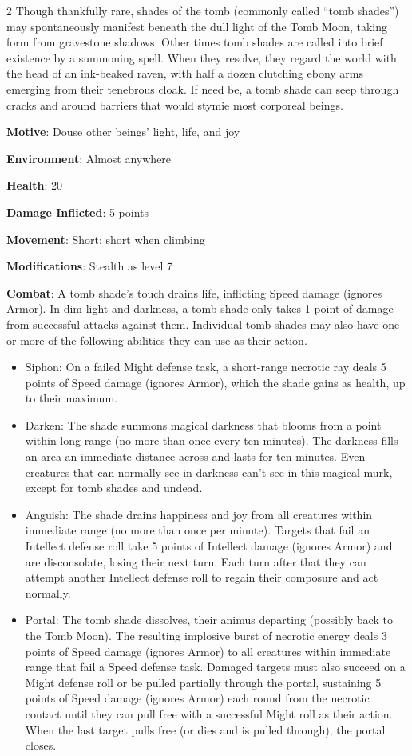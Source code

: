 \begin{multicols}{2}
Though thankfully rare, shades of the tomb (commonly called “tomb shades”) may spontaneously manifest beneath the dull light of the Tomb Moon, taking form from gravestone shadows. Other times tomb shades are called into brief existence by a summoning spell. When they resolve, they regard the world with the head of an ink-beaked raven, with half a dozen clutching ebony arms emerging from their tenebrous cloak. If need be, a tomb shade can seep through cracks and around barriers that would stymie most corporeal beings.

\textbf{Motive}: Douse other beings’ light, life, and joy 

\textbf{Environment}: Almost anywhere 

\textbf{Health}: 20 

\textbf{Damage Inflicted}: 5 points 

\textbf{Movement}: Short; short when climbing 

\textbf{Modifications}: Stealth as level 7 

\textbf{Combat}: A tomb shade’s touch drains life, inflicting Speed damage (ignores Armor). 
In dim light and darkness, a tomb shade only takes 1 point of damage from successful attacks against them. 
Individual tomb shades may also have one or more of the following abilities they can use as their action.
\begin{itemize}
\item 	Siphon: On a failed Might defense task, a short-range necrotic ray deals 5 points of Speed damage (ignores Armor), which the shade gains as health, up to their maximum. 
\item 	Darken: The shade summons magical darkness that blooms from a point within long range (no more than once every ten minutes). The darkness fills an area an immediate distance across and lasts for ten minutes. Even creatures that can normally see in darkness can’t see in this magical murk, except for tomb shades and undead. 
\item 	Anguish: The shade drains happiness and joy from all creatures within immediate range (no more than once per minute). Targets that fail an Intellect defense roll take 5 points of Intellect damage (ignores Armor) and are disconsolate, losing their next turn. Each turn after that they can attempt another Intellect defense roll to regain their composure and act normally. 
\item 	Portal: The tomb shade dissolves, their animus departing (possibly back to the Tomb Moon). The resulting implosive burst of necrotic energy deals 3 points of Speed damage (ignores Armor) to all creatures within immediate range that fail a Speed defense task. Damaged targets must also succeed on a Might defense roll or be pulled partially through the portal, sustaining 5 points of Speed damage (ignores Armor) each round from the necrotic contact until they can pull free with a successful Might roll as their action. When the last target pulls free (or dies and is pulled through), the portal closes. 
\end{itemize}


\end{multicols}
